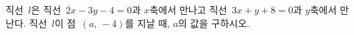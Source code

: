 직선~$l$은 직선~$2x-3y-4=0$과 $x$축에서 만나고 직선~$3x+y+8=0$과 $y$축에서 만난다. 직선~$l$이 점~$(a,\,-4)$를 지날 때, $a$의 값을 구하시오.
